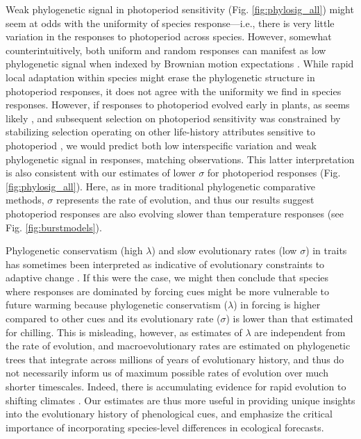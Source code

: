 \documentclass[11pt]{article}
\begin{document}
Weak phylogenetic signal in photoperiod sensitivity (Fig. \ref{fig:phylosig_all}) might seem at odds with the uniformity of species response---i.e., there is very little variation in the responses to photoperiod across species. However, somewhat counterintuitively, both uniform and random responses can manifest as low phylogenetic signal when indexed by Brownian motion expectations \citep{wiens2010niche}. While rapid local adaptation within species might erase the phylogenetic structure in photoperiod responses, it does not agree with the uniformity we find in species responses. However, if responses to photoperiod evolved early in plants, as seems likely \citep{serrano2017}, and subsequent selection on photoperiod sensitivity was constrained by stabilizing selection operating on other life-history attributes sensitive to photoperiod \citep[e.g.,][]{Rinne:1994,Wilczek2014,azeez2015}, we would predict both low interspecific variation and weak phylogenetic signal in responses, matching observations. This latter interpretation is also consistent with our estimates of lower $\sigma$ for photoperiod responses (Fig. \ref{fig:phylosig_all}). Here, as in more traditional phylogenetic comparative methods, $\sigma$ represents the rate of evolution, and thus our results suggest photoperiod responses are also evolving slower than temperature responses (see Fig. \ref{fig:burstmodels}).

Phylogenetic conservatism (high $\lambda$) and slow evolutionary rates (low $\sigma$) in traits has sometimes been interpreted as indicative of evolutionary constraints to adaptive change \citep{wiens2010niche,bennett2021evolution}. If this were the case, we might then conclude that species where responses are dominated by forcing cues might be more vulnerable to future warming because phylogenetic conservatism ($\lambda$) in forcing is higher compared to other cues and its evolutionary rate ($\sigma$) is lower than that estimated for chilling. This is misleading, however, as estimates of $\lambda$ are independent from the rate of evolution, and macroevolutionary rates are estimated on phylogenetic trees that integrate across millions of years of evolutionary history, and thus do not necessarily inform us of maximum possible rates of evolution over much shorter timescales. Indeed, there is accumulating evidence for rapid evolution to shifting climates \citep{bradshaw2006,franks2014}. Our estimates are thus more useful in providing unique insights into the evolutionary history of phenological cues, and emphasize the critical importance of incorporating species-level differences in ecological forecasts.
\end{document}
